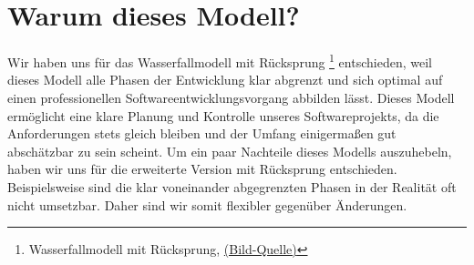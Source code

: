 \section{Warum dieses Modell?}
Wir haben uns für das Wasserfallmodell mit Rücksprung
\footnote{Wasserfallmodell mit Rücksprung, \href{http://upload.wikimedia.org/wikipedia/commons/thumb/e/e5/Wasserfallmodell.svg/567px-Wasserfallmodell.svg.png}{(Bild-Quelle)}}
entschieden, weil dieses Modell alle Phasen der 
Entwicklung klar abgrenzt und sich optimal auf einen professionellen Softwareentwicklungsvorgang
abbilden lässt. Dieses Modell ermöglicht eine klare Planung und Kontrolle unseres Softwareprojekts,
da die Anforderungen stets gleich bleiben und der Umfang einigermaßen gut abschätzbar zu sein scheint.
Um ein paar Nachteile dieses Modells auszuhebeln, haben wir uns für die erweiterte Version mit Rücksprung entschieden.
Beispielsweise sind die klar voneinander abgegrenzten Phasen
in der Realität oft nicht umsetzbar. Daher sind wir somit flexibler gegenüber Änderungen.
